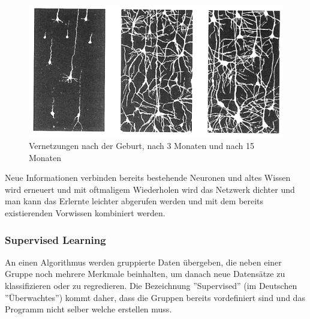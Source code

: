 \begin{figure}[ht]
    \centering
    \includegraphics[scale=0.8]{sections/machine-learning/images/neuronale-netze.png}
    \caption{Vernetzungen nach der Geburt, nach 3 Monaten und nach 15 Monaten}
\end{figure}

Neue Informationen verbinden bereits bestehende Neuronen und altes Wissen wird erneuert und mit oftmaligem Wiederholen wird das Netzwerk dichter und man kann das Erlernte leichter abgerufen werden und mit dem bereits existierenden Vorwissen kombiniert werden. \cite{LANP}

\subsubsection{Supervised Learning}

An einen Algorithmus werden gruppierte Daten übergeben, die neben einer Gruppe noch mehrere Merkmale beinhalten, um danach neue Datensätze zu klassifizieren oder zu regredieren. Die Bezeichnung ''Supervised'' (im Deutschen ''Überwachtes'') kommt daher, dass die Gruppen bereits vordefiniert sind und das Programm nicht selber welche erstellen muss. \cite{SL:online}

\begin{table}[ht]
    \centering
    \caption{Beispiel für gruppierte Daten als Tabelle; Merkmale: Farbe, Form, Geschmack; Gruppe: Frucht}
    \label{tbl:fruit-data}
\end{table}

